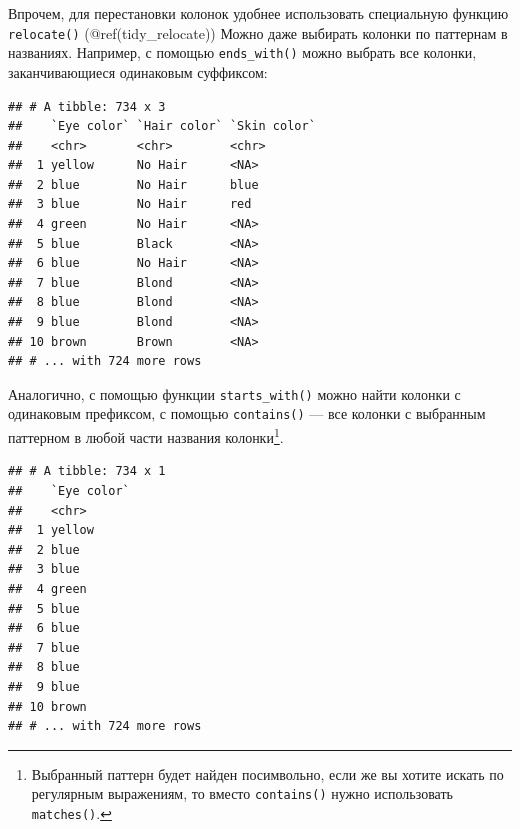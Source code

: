 \documentclass[]{book}
\newenvironment{Shaded}{\begin{snugshade}}{\end{snugshade}}
\newcommand{\KeywordTok}[1]{\textcolor[rgb]{0.13,0.29,0.53}{\textbf{#1}}}
\newcommand{\StringTok}[1]{\textcolor[rgb]{0.31,0.60,0.02}{#1}}
\newcommand{\OperatorTok}[1]{\textcolor[rgb]{0.81,0.36,0.00}{\textbf{#1}}}
\newcommand{\NormalTok}[1]{#1}
\begin{document}
Впрочем, для перестановки колонок удобнее использовать специальную
функцию \texttt{relocate()} (@ref(tidy\_relocate)) Можно даже выбирать
колонки по паттернам в названиях. Например, с помощью
\texttt{ends\_with()} можно выбрать все колонки, заканчивающиеся
одинаковым суффиксом:

\begin{Shaded}
\end{Shaded}

\begin{verbatim}
## # A tibble: 734 x 3
##    `Eye color` `Hair color` `Skin color`
##    <chr>       <chr>        <chr>       
##  1 yellow      No Hair      <NA>        
##  2 blue        No Hair      blue        
##  3 blue        No Hair      red         
##  4 green       No Hair      <NA>        
##  5 blue        Black        <NA>        
##  6 blue        No Hair      <NA>        
##  7 blue        Blond        <NA>        
##  8 blue        Blond        <NA>        
##  9 blue        Blond        <NA>        
## 10 brown       Brown        <NA>        
## # ... with 724 more rows
\end{verbatim}

Аналогично, с помощью функции \texttt{starts\_with()} можно найти
колонки с одинаковым префиксом, с помощью \texttt{contains()} --- все
колонки с выбранным паттерном в любой части названия колонки\footnote{Выбранный
  паттерн будет найден посимвольно, если же вы хотите искать по
  регулярным выражениям, то вместо \texttt{contains()} нужно
  использовать \texttt{matches()}.}.

\begin{Shaded}
\end{Shaded}

\begin{verbatim}
## # A tibble: 734 x 1
##    `Eye color`
##    <chr>      
##  1 yellow     
##  2 blue       
##  3 blue       
##  4 green      
##  5 blue       
##  6 blue       
##  7 blue       
##  8 blue       
##  9 blue       
## 10 brown      
## # ... with 724 more rows
\end{verbatim}
\end{document}

